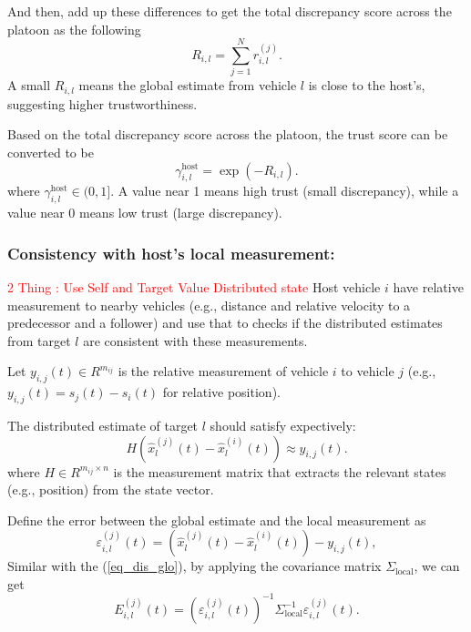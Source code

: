 \documentclass{ifacconf}
\def\eqref#1{(\ref{#1})}
\begin{document}
And then, add up these differences to get the total discrepancy score across the platoon as the following
\begin{equation}
    R_{i,l} = \sum_{j=1}^N r_{i,l}^{(j)}.
\end{equation}
A small  $R_{i,l}$ means the global estimate from vehicle $l$ is close to the host's, suggesting higher trustworthiness.

Based on the total discrepancy score across the platoon, the trust score can be converted to be 
\begin{equation}
    \gamma_{i,l}^{\text{host}} = \exp\left( -{R_{i,l}} \right).
\end{equation}
where $\gamma_{i,l}^{\text{host}} \in (0, 1]$. A value near 1 means high trust (small discrepancy), while a value near 0 means low trust (large discrepancy).


\subsubsection{Consistency with host's local measurement:}
\textcolor{red}{2 Thing : Use Self and Target Value Distributed state 
}
Host vehicle  $i$  have relative measurement to nearby vehicles (e.g., distance and relative velocity to a predecessor and a follower) and use that to checks if the distributed estimates from target $l$ are consistent with these measurements.

Let $y_{i,j}(t) \in R^{m_{ij}} $ is the relative measurement of vehicle  $i$ to vehicle $ j $ (e.g., $ y_{i,j}(t) = s_{j}(t) - s_{i}(t) $ for relative position).

The distributed estimate of target $l$  should satisfy expectively:
\begin{equation*}
    H(\hat{x}_l^{(j)}(t) - \hat{x}_l^{(i)}(t)) \approx y_{i,j}(t).
\end{equation*}
where $H \in R^{m_{ij} \times n}$ is the measurement matrix that extracts the relevant states (e.g., position) from the state vector.

Define the error between the global estimate and the local measurement as
\begin{equation}
    \varepsilon_{i,l}^{(j)}(t) = \left( \hat{x}_l^{(j)}(t) - \hat{x}_l^{(i)}(t) \right) - y_{i,j}(t), 
\end{equation}
Similar with the \eqref{eq_dis_glo}, by applying the covariance matrix $\Sigma_{\text{local}}$, we can get 
\begin{equation}
    E_{i,l}^{(j)}(t) = (\varepsilon_{i,l}^{(j)}(t))^{-1} \Sigma_{\text{local}}^{-1} \varepsilon_{i,l}^{(j)}(t).
\end{equation}
\end{document}
